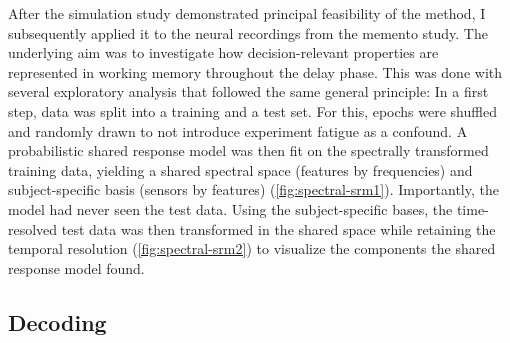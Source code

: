 After the simulation study demonstrated principal feasibility of the method, I subsequently applied it to the neural recordings from the memento study.
The underlying aim was to investigate how decision-relevant properties are represented in working memory throughout the delay phase.
This was done with several exploratory analysis that followed the same general principle:
In a first step, data was split into a training and a test set.
For this, epochs were shuffled and randomly drawn to not introduce experiment fatigue as a confound.
A probabilistic shared response model was then fit on the spectrally transformed training data, yielding a shared spectral space (features by frequencies) and subject-specific basis (sensors by features) (\ref{fig:spectral-srm1}).
Importantly, the model had never seen the test data.
Using the subject-specific bases, the time-resolved test data was then transformed in the shared space while retaining the temporal resolution (\ref{fig:spectral-srm2}) to visualize the components the shared response model found.

\pagebreak
\subsection{Decoding}
\label{decoding-analysis}

